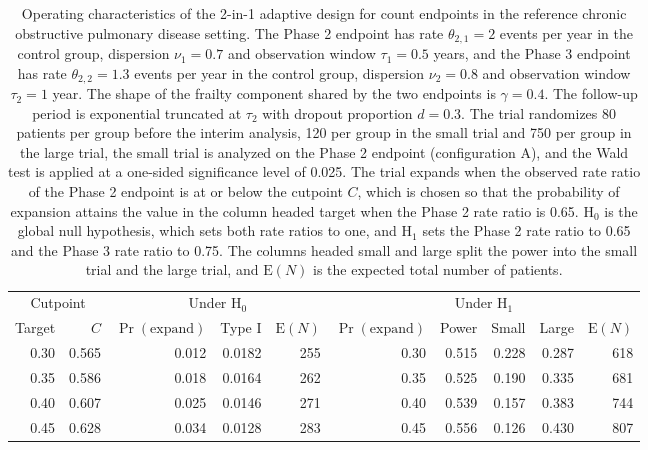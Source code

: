 \begin{table}[htbp]
\centering
\caption{Operating characteristics of the 2-in-1 adaptive design for count endpoints in the reference chronic obstructive pulmonary disease setting. The Phase 2 endpoint has rate $\theta_{2,1} = 2$ events per year in the control group, dispersion $\nu_1 = 0.7$ and observation window $\tau_1 = 0.5$ years, and the Phase 3 endpoint has rate $\theta_{2,2} = 1.3$ events per year in the control group, dispersion $\nu_2 = 0.8$ and observation window $\tau_2 = 1$ year. The shape of the frailty component shared by the two endpoints is $\gamma = 0.4$. The follow-up period is exponential truncated at $\tau_2$ with dropout proportion $d = 0.3$. The trial randomizes 80 patients per group before the interim analysis, 120 per group in the small trial and 750 per group in the large trial, the small trial is analyzed on the Phase 2 endpoint (configuration A), and the Wald test is applied at a one-sided significance level of 0.025. The trial expands when the observed rate ratio of the Phase 2 endpoint is at or below the cutpoint $C$, which is chosen so that the probability of expansion attains the value in the column headed target when the Phase 2 rate ratio is 0.65. $\mathrm{H}_0$ is the global null hypothesis, which sets both rate ratios to one, and $\mathrm{H}_1$ sets the Phase 2 rate ratio to 0.65 and the Phase 3 rate ratio to 0.75. The columns headed small and large split the power into the small trial and the large trial, and $\mathrm{E}(N)$ is the expected total number of patients.}
\label{tab:operating}
\vspace{0.6em}
\footnotesize
\setlength{\tabcolsep}{3pt}
\begin{tabular}{rrrrrrrrrr}
\hline
\multicolumn{2}{c}{Cutpoint} & \multicolumn{3}{c}{Under $\mathrm{H}_0$} & \multicolumn{5}{c}{Under $\mathrm{H}_1$} \\
\cline{1-2}\cline{3-5}\cline{6-10}
Target & $C$ & $\Pr(\mathrm{expand})$ & Type I & $\mathrm{E}(N)$ & $\Pr(\mathrm{expand})$ & Power & Small & Large & $\mathrm{E}(N)$ \\
\hline
0.30 & 0.565 & 0.012 & 0.0182 & 255 & 0.30 & 0.515 & 0.228 & 0.287 & 618 \\
0.35 & 0.586 & 0.018 & 0.0164 & 262 & 0.35 & 0.525 & 0.190 & 0.335 & 681 \\
0.40 & 0.607 & 0.025 & 0.0146 & 271 & 0.40 & 0.539 & 0.157 & 0.383 & 744 \\
0.45 & 0.628 & 0.034 & 0.0128 & 283 & 0.45 & 0.556 & 0.126 & 0.430 & 807 \\

\end{tabular}
\end{table}
